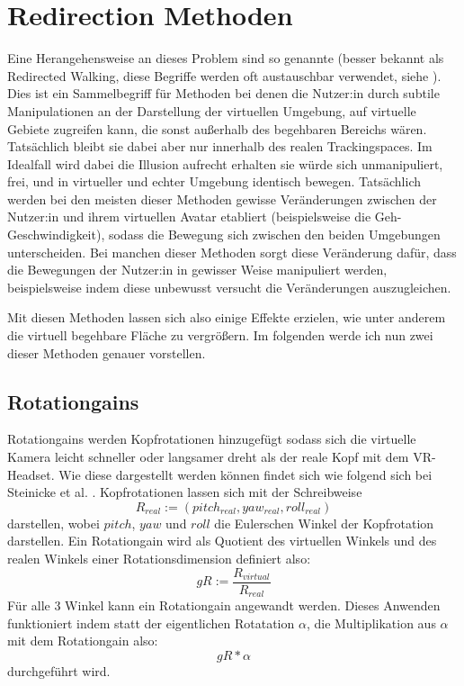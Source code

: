 \section{Redirection Methoden}
Eine Herangehensweise an dieses Problem sind so genannte  (besser bekannt als Redirected Walking, diese Begriffe werden oft austauschbar verwendet, siehe \cite{redwalk_uebersicht}). Dies ist ein Sammelbegriff für Methoden bei denen die Nutzer:in durch subtile Manipulationen an der Darstellung der virtuellen Umgebung, auf virtuelle Gebiete zugreifen kann, die sonst außerhalb des begehbaren Bereichs wären. Tatsächlich bleibt sie dabei aber nur innerhalb des realen Trackingspaces.
Im Idealfall wird dabei die Illusion aufrecht erhalten sie würde sich unmanipuliert, frei, und in virtueller und echter Umgebung identisch bewegen. Tatsächlich werden bei den meisten dieser Methoden %
gewisse Veränderungen zwischen der Nutzer:in und ihrem virtuellen Avatar etabliert (beispielsweise die Geh-Geschwindigkeit), sodass die Bewegung sich zwischen den beiden Umgebungen unterscheiden.
Bei manchen dieser Methoden sorgt diese Veränderung dafür, dass die Bewegungen der Nutzer:in in gewisser Weise manipuliert werden, beispielsweise indem diese unbewusst versucht die Veränderungen auszugleichen.

Mit diesen Methoden lassen sich also einige Effekte erzielen, wie unter anderem die virtuell begehbare Fläche zu vergrößern.
Im folgenden werde ich nun zwei dieser Methoden genauer vorstellen.

\subsection{Rotationgains}
Rotationgains werden Kopfrotationen hinzugefügt sodass sich die virtuelle Kamera leicht schneller oder langsamer dreht als der reale
Kopf mit dem VR-Headset.
Wie diese dargestellt werden können findet sich wie folgend sich bei Steinicke et al. \cite{detection-thresholds}.
Kopfrotationen lassen sich mit der Schreibweise
$$ R_{real} := (pitch_{real}, yaw_{real}, roll_{real}) $$
darstellen, wobei $pitch$, $yaw$ und $roll$ die Eulerschen Winkel der Kopfrotation darstellen. Ein Rotationgain wird als Quotient des virtuellen Winkels und des realen Winkels einer Rotationsdimension definiert also:
$$ gR := \frac{R_{virtual}}{R_{real}} $$
Für alle 3 Winkel kann ein Rotationgain angewandt werden.
Dieses Anwenden funktioniert indem statt der eigentlichen Rotatation $\alpha$, die Multiplikation aus $\alpha$ mit dem Rotationgain also:
$$ gR * \alpha $$
durchgeführt wird.

